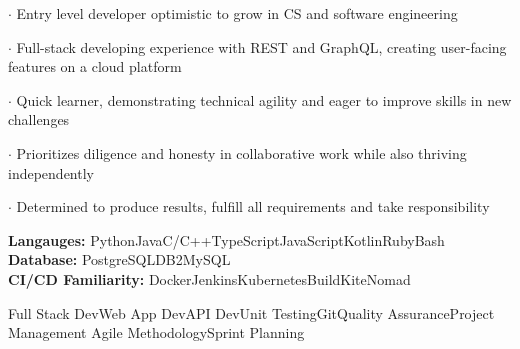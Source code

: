 \documentclass[9pt]{developercv} %
\begin{document}
\vspace{0.5cm}



\begin{minipage}[t]{\textwidth}
	\vspace{-\baselineskip} %
	
	$\cdot$ Entry level developer optimistic to grow in CS and software engineering

	$\cdot$ Full-stack developing experience with REST and GraphQL, creating user-facing features on a cloud platform
	
	$\cdot$ Quick learner, demonstrating technical agility and eager to improve skills in new challenges
	
	$\cdot$ Prioritizes diligence and honesty in collaborative work while also thriving independently
	
	$\cdot$ Determined to produce results, fulfill all requirements and take responsibility
\end{minipage}

\hfill %


\begin{minipage}[t]{\textwidth}
	\vspace{-\baselineskip} %

	\textbf{Langauges:} Python\slashsep Java\slashsep C/C++\slashsep TypeScript\slashsep JavaScript\slashsep Kotlin\slashsep Ruby\slashsep Bash\\
	\textbf{Database: } PostgreSQL\slashsep DB2\slashsep MySQL\\
	\textbf{CI/CD Familiarity: } Docker\slashsep Jenkins\slashsep Kubernetes\slashsep BuildKite\slashsep Nomad
\end{minipage}

\hfill %


\begin{minipage}[t]{\textwidth}
	\vspace{-\baselineskip} %

	\begin{center}
		Full Stack Dev\slashsep Web App Dev\slashsep API Dev\slashsep Unit Testing\slashsep Git\slashsep Quality Assurance\slashsep Project Management\slashsep
		Agile Methodology\slashsep Sprint Planning
	\end{center}

\end{minipage}
\end{document}
